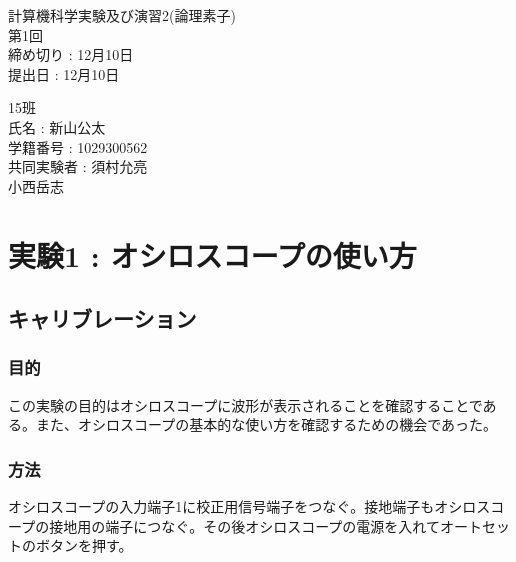 \documentclass{jsarticle}
\begin{document}
\begin{titlepage}
    \begin{center}
        \vspace*{12pt}
        {\LARGE 計算機科学実験及び演習2(論理素子)}
        \vspace{12pt}\\
        {第1回}
        \vspace{60pt}\\
        {締め切り : 12月10日}
        \vspace{12pt}\\
        {提出日 : 12月10日}
    \end{center}
    \begin{flushright}
        \vspace*{300pt}
        {15班}
        \vspace{12pt}\\
        {氏名 : 新山公太}
        \vspace{3pt}\\
        {学籍番号 : 1029300562}
        \vspace{3pt}\\
        {共同実験者 : 須村允亮}
        \vspace{3pt}\\
        {\phantom{共同実験者 : }小西岳志}
    \end{flushright}
    
\end{titlepage}

\section{実験1 : オシロスコープの使い方}
\subsection{キャリブレーション}
\subsubsection{目的}
この実験の目的はオシロスコープに波形が表示されることを確認することである。また、オシロスコープの基本的な使い方を確認するための機会であった。
\subsubsection{方法}
オシロスコープの入力端子1に校正用信号端子をつなぐ。接地端子もオシロスコープの接地用の端子につなぐ。その後オシロスコープの電源を入れてオートセットのボタンを押す。
\end{document}

